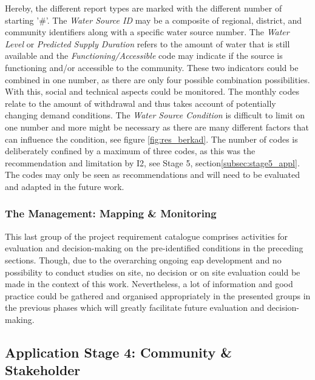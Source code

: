 Hereby, the different report types are marked with the different number of starting '\#'. The \textit{Water Source ID} may be a composite of regional, district, and community identifiers along with a specific water source number. The \textit{Water Level} or \textit{Predicted Supply Duration} refers to the amount of water that is still available and the \textit{Functioning/Accessible} code may indicate if the source is functioning and/or accessible to the community. These two indicators could be combined in one number, as there are only four possible combination possibilities. With this, social and technical aspects could be monitored. The monthly codes relate to the amount of withdrawal and thus takes account of potentially changing demand conditions. The \textit{Water Source Condition} is difficult to limit on one number and more might be necessary as there are many different factors that can influence the condition, see figure \ref{fig:res_berkad}. The number of codes is deliberately confined by a maximum of three codes, as this was the recommendation and limitation by I2, see Stage 5, section\ref{subsec:stage5_appl}. The codes may only be seen as recommendations and will need to be evaluated and adapted in the future work.

\subsubsection*{The Management: Mapping \& Monitoring}

This last group of the project requirement catalogue comprises activities for evaluation and decision-making on the pre-identified conditions in the preceding sections. Though, due to the overarching ongoing \acrshort{eap} development and no possibility to conduct studies on site, no decision or on site evaluation could be made in the context of this work. Nevertheless, a lot of information and good practice could be gathered and organised appropriately in the presented groups in the previous phases which will greatly facilitate future evaluation and decision-making.

\subsection{Application Stage 4: Community \& Stakeholder}\label{subsec:stage4_appl} 

